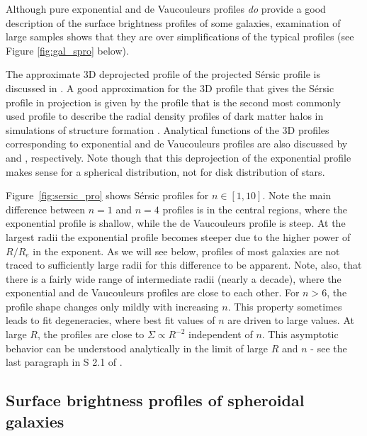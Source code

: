 Although pure exponential and de Vaucouleurs profiles \emph{do} provide a good description of the surface brightness profiles of some galaxies, examination of large samples shows that they are over simplifications of the typical profiles (see Figure \ref{fig:gal_spro} below). 

The approximate 3D deprojected profile of the projected S\'ersic profile is discussed in \href{http://adsabs.harvard.edu/abs/1999MNRAS.309..481L}{\citet{lima_neto99}}. A good approximation for the 3D profile that gives the S\'ersic profile in projection is given by the \citet[][]{einasto65} profile that is the second most commonly used profile to describe the radial density profiles of dark matter halos in simulations of structure formation \citep[see][for detailed information about this profile]{merritt_etal06} . 
Analytical functions of the 3D profiles corresponding to exponential and de Vaucouleurs profiles are also discussed by \href{http://adsabs.harvard.edu/abs/1997MNRAS.288..457P}{\citet{pitts_tayler97}} and \href{http://adsabs.harvard.edu/abs/1990ApJ...356..359H}{\citet{hernquist90}}, respectively. Note though that this deprojection of the exponential profile makes sense for a spherical distribution, not for disk distribution of stars. 

Figure~\ref{fig:sersic_pro} shows S\'ersic profiles for $n\in[1,10]$. 
Note the main difference between $n=1$ and $n=4$ profiles is in the central regions, where the exponential profile is shallow, while the de Vaucouleurs profile is steep. At the largest radii the exponential profile becomes steeper due to the higher power of $R/R_e$ in the exponent. As we will see below, profiles of most galaxies are not traced to sufficiently large radii for this difference to be apparent. Note, also, that there is a fairly wide range of intermediate radii (nearly a decade), where the exponential and de Vaucouleurs profiles are close to each other. For $n>6$, the profile shape changes only mildly with increasing $n$. This property sometimes leads to fit degeneracies, where best fit values of $n$ are driven to large values. At large $R$, the profiles are close to $\Sigma\propto R^{-2}$ independent of $n$. This asymptotic behavior can be understood analytically in the limit of large $R$ and $n$ - see the last paragraph in S 2.1 of \href{http://ned.ipac.caltech.edu/level5/March05/Graham/Graham2.html}{\citet{graham_driver05}}. 

\subsection{Surface brightness profiles of spheroidal galaxies}

